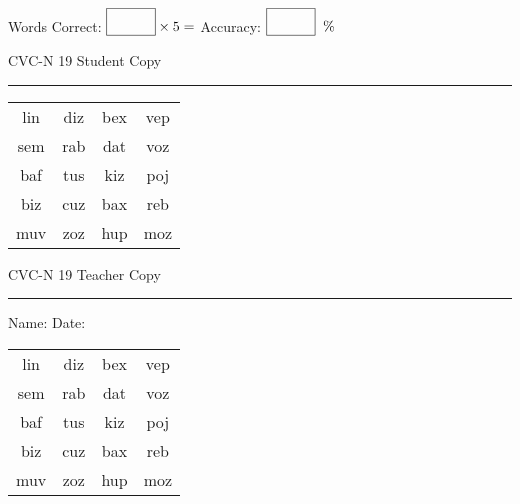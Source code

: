 \documentclass{memoir}
\begin{document}
\small

Words Correct: $\fbox{\phantom{\huge 100}} \times 5 = $ Accuracy: $\fbox{\phantom{\huge 100}}\;\; \%$ 

\vfill

\newpage


\footnotesize \noindent
CVC-N 19 \hfill Student Copy
\smallskip
\hrule

\Large

\setlength{\tabcolsep}{14pt}
\def\arraystretch{2}

{\selectfont


\begin{vplace}[0.5]
\begin{center}
\begin{tabular}{cccc}
lin & diz & bex & vep \\
sem & rab & dat & voz \\
baf & tus & kiz & poj \\
biz & cuz & bax & reb \\
muv & zoz & hup & moz \\
\end{tabular}
\end{center}
\end{vplace}

}

\newpage

\footnotesize \noindent
CVC-N 19 \hfill Teacher Copy
\smallskip
\hrule

\small

\vfill

\noindent
Name: \underline{\hspace{1.75in}} \hfill Date: \underline{\hspace{1in}}

\Large

{\selectfont


\begin{vplace}[0.5]
\begin{center}
\begin{tabular}{cccc}
lin & diz & bex & vep \\
sem & rab & dat & voz \\
baf & tus & kiz & poj \\
biz & cuz & bax & reb \\
muv & zoz & hup & moz \\
\end{tabular}
\end{center}
\end{vplace}



}
\end{document}
